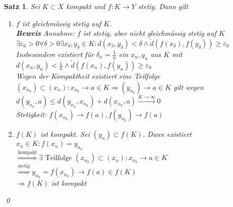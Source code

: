 \documentclass[ngerman,titlepage,twoside, parskip=half*]{scrreprt}
\theoremstyle{plain}
\newtheorem{theorem}{Satz}[section]
\theoremstyle{definition}
\theoremstyle{remark}
\begin{document}
\begin{theorem}
\label{satz:gleichm-stetig}
Sei $K\subset X$ kompakt und $f\colon K\rightarrow Y$ stetig. Dann gilt
\begin{enumerate}[(1)]
  \item $f$ ist gleichmässig stetig auf $K$.\\
    \textbf{Beweis} Annahme: $f$ ist stetig, aber nicht gleichmässig stetig auf $K$\\
    $\exists \varepsilon_0>0 \forall \delta >0 \exists x_{\delta},y_{\delta}\in K\colon d(x_{\delta},
    y_{\delta})<\delta\wedge\tilde{d}(f(x_{\delta}),f(y_{\delta}))\geq \varepsilon_0$\\
    Insbesondere existiert für $\delta_n=\frac{1}{n}$ ein $x_n,y_n$ aus $K$ mit \\
    $d(x_n,y_n)<\frac{1}{n}
    \wedge \tilde{d}(f(x_n),f(y_n))\geq \varepsilon_0$\\
    Wegen der Kompaktheit existiert eine Teilfolge $(x_{n_k})\subset (x_n)\colon x_{n_k}\rightarrow a\in K
    \Rightarrow (y_{n_k})\rightarrow a\in K$ gilt wegen $d(y_{n_k},a)\leq d(y_{n_k},x_{n_k})+d(x_{n_k},a)
    \stackrel{K\rightarrow\infty}{\rightarrow}0$\\
    Stetigkeit: $f(x_{n_k})\rightarrow f(a), f(y_{n_k})\rightarrow f(a)$\textnormal{\lightning}
  \item $f(K)$  ist kompakt.
    Sei $(y_n)\subset f(K)$. Dann existiert $x_n \in K\colon f(x_n)=y_{n_k}$\\
    $\stackrel{\text{kompakt}}{\Rightarrow} \exists \text{ Teilfolge } (x_{n_k})\subset (x_n)\colon x_{n_k}\rightarrow
    a \in K$\\
    $\stackrel{\text{stetig}}{\Rightarrow} y_{n_k}=f(x_{n_k})\rightarrow f(a) \in f(K)$\\
    $\Rightarrow f(K)$ ist kompakt
\end{enumerate}
\qed
\end{theorem}
\end{document}
